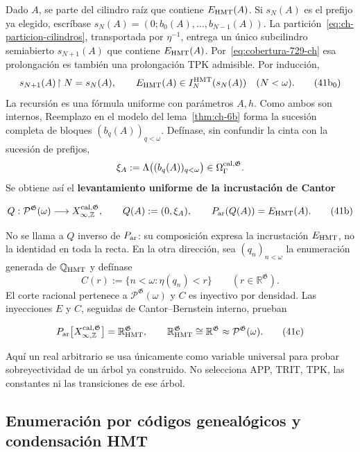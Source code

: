Dado \(A\), se parte del cilindro raíz que contiene \(E_{\rm HMT}(A)\). Si
\(s_N(A)\) es el prefijo ya elegido, escríbase
\(s_N(A)=(0;b_0(A),\ldots,b_{N-1}(A))\). La partición~\eqref{eq:ch-particion-cilindros}, transportada
por \(\eta^{-1}\), entrega un único subcilindro semiabierto
\(s_{N+1}(A)\) que contiene \(E_{\rm HMT}(A)\). Por~\eqref{eq:cobertura-729-ch} esa prolongación es
también una prolongación TPK admisible. Por inducción,
\[
 s_{N+1}(A)\!\upharpoonright N=s_N(A),\qquad
 E_{\rm HMT}(A)\in I_N^{\rm HMT}(s_N(A))\quad(N<\omega).
\tag{41b$_0$}\label{eq:ch-prefijos-uniformes}
\]
La recursión es una fórmula uniforme con parámetros \(A,h\). Como ambos son
internos, Reemplazo en el modelo del lema~\ref{thm:ch-6b} forma la sucesión completa de
bloques \((b_q(A))_{q<\omega}\). Defínase, sin confundir la cinta con la
sucesión de prefijos,
\[
 \xi_A:=\Lambda\bigl((b_q(A))_{q<\omega}\bigr)
 \in\Omega_\Gamma^{\rm cal,\mathfrak G}.
\]
Se obtiene así el \textbf{levantamiento uniforme de la incrustación de Cantor}

\[
 Q:\mathcal P^{\mathfrak G}(\omega)
 \longrightarrow X_{\infty,\mathbb Z}^{\rm cal,\mathfrak G},
 \qquad
 Q(A):=(0,\xi_A),\qquad
 P_{\rm ar}(Q(A))=E_{\rm HMT}(A).
\tag{41b}\label{eq:ch-levantamiento-uniforme}
\]

No se llama a \(Q\) inverso de \(P_{\rm ar}\): su composición expresa la
incrustación \(E_{\rm HMT}\), no la identidad en toda la recta. En la otra
dirección, sea \((q_n)_{n<\omega}\) la enumeración generada de
\(\mathbb Q_{\rm HMT}\) y defínase
\[
 C(r):=\{n<\omega:\eta(q_n)<r\}
 \qquad(r\in\mathbb R^{\mathfrak G}).
\]
El corte racional pertenece a \(\mathcal P^{\mathfrak G}(\omega)\) y
\(C\) es inyectivo por densidad. Las inyecciones \(E\) y \(C\), seguidas de
Cantor--Bernstein interno, prueban

\[
 P_{\rm ar}
 \bigl[X_{\infty,\mathbb Z}^{\rm cal,\mathfrak G}\bigr]
 =\mathbb R_{\rm HMT}^{\mathfrak G},
 \qquad
 \mathbb R_{\rm HMT}^{\mathfrak G}
 \cong\mathbb R^{\mathfrak G}
 \approx\mathcal P^{\mathfrak G}(\omega).
\tag{41c}\label{eq:ch-recta-potencia}
\]

Aquí un real arbitrario se usa únicamente como variable universal para probar
sobreyectividad de un árbol ya construido. No selecciona APP, TRIT, TPK, las
constantes ni las transiciones de ese árbol.

\subsection{Enumeración por códigos genealógicos y condensación HMT}


